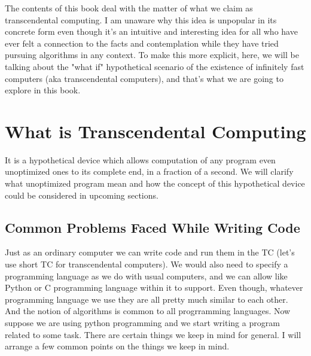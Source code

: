 \documentclass{book}
\begin{document}
The contents of this book deal with the matter of what we claim as transcendental computing. I am unaware why this idea is unpopular in its concrete form even though it's an intuitive and interesting idea for all who have ever felt a connection to the facts and contemplation while they have tried pursuing algorithms in any context. To make this more explicit, here, we will be talking about the "what if" hypothetical scenario of the existence of infinitely fast computers (aka transcendental computers), and that's what we are going to explore in this book.

\chapter{What is Transcendental Computing}

It is a hypothetical device which allows computation of any program even unoptimized ones to its complete end, in a fraction of a second. We will clarify what unoptimized program mean and how the concept of this hypothetical device could be considered in upcoming sections.

\section{Common Problems Faced While Writing Code}

Just as an ordinary computer we can write code and run them in the TC (let's use short TC for transcendental computers). We would also need to specify a programming language as we do with usual computers, and we can allow like Python or C programming language within it to support. Even though, whatever programming language we use they are all pretty much similar to each other. And the notion of algorithms is common to all progrramming languages. Now suppose we are using python programming and we start writing a program related to some task. There are certain things we keep in mind for general. I will arrange a few common points on the things we keep in mind.
 
\end{document}
